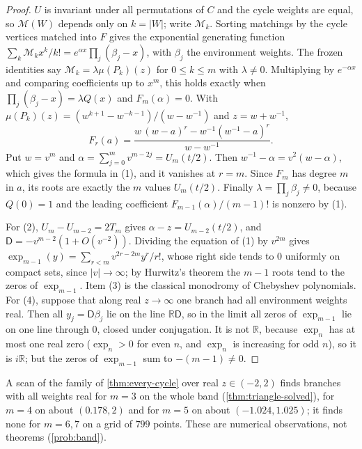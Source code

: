\documentclass[final]{siamart0516}
\numberwithin{theorem}{section}
\numberwithin{equation}{section}
\theoremstyle{siamnonum}
\renewenvironment{remark*}{\remarkstar}{\endremarkstar}
\theoremstyle{plain}
\newcommand{\RR}{\mathbb{R}}
\newcommand{\Mpot}{\mathcal{M}}           %
\begin{document}
\begin{proof}
$U$ is invariant under all permutations of $C$ and the cycle weights are equal, so $\Mpot(W)$ depends only on $k=|W|$; write $\Mpot_k$. Sorting matchings by the cycle vertices matched into $F$ gives the exponential generating function $\sum_k\Mpot_kx^{k}/k!=e^{\alpha x}\prod_j(\beta_j-x)$, with $\beta_j$ the environment weights. The frozen identities say $\Mpot_k=\lambda\mu(P_k)(z)$ for $0\le k\le m$ with $\lambda\neq0$. Multiplying by $e^{-\alpha x}$ and comparing coefficients up to $x^m$, this holds exactly when $\prod_j(\beta_j-x)=\lambda Q(x)$ and $F_m(\alpha)=0$. With $\mu(P_k)(z)=(w^{k+1}-w^{-k-1})/(w-w^{-1})$ and $z=w+w^{-1}$,
\[
F_r(a)=\frac{w\,(w-a)^{r}-w^{-1}(w^{-1}-a)^{r}}{w-w^{-1}}.
\]
Put $w=v^{m}$ and $\alpha=\sum_{j=0}^{m}v^{m-2j}=U_m(t/2)$. Then $w^{-1}-\alpha=v^{2}(w-\alpha)$, which gives the formula in (1), and it vanishes at $r=m$. Since $F_m$ has degree $m$ in $a$, its roots are exactly the $m$ values $U_m(t/2)$. Finally $\lambda=\prod_j\beta_j\neq0$, because $Q(0)=1$ and the leading coefficient $F_{m-1}(\alpha)/(m-1)!$ is nonzero by (1).

For (2), $U_m-U_{m-2}=2T_m$ gives $\alpha-z=U_{m-2}(t/2)$, and $\mathsf D=-v^{m-2}(1+O(v^{-2}))$. Dividing the equation of (1) by $v^{2m}$ gives $\exp_{m-1}(y)=\sum_{r<m}v^{2r-2m}y^{r}/r!$, whose right side tends to $0$ uniformly on compact sets, since $|v|\to\infty$; by Hurwitz's theorem the $m-1$ roots tend to the zeros of $\exp_{m-1}$. Item (3) is the classical monodromy of Chebyshev polynomials. For (4), suppose that along real $z\to\infty$ one branch had all environment weights real. Then all $y_j=\mathsf D\beta_j$ lie on the line $\RR\mathsf D$, so in the limit all zeros of $\exp_{m-1}$ lie on one line through $0$, closed under conjugation. It is not $\RR$, because $\exp_n$ has at most one real zero ($\exp_n>0$ for even $n$, and $\exp_n$ is increasing for odd $n$), so it is $i\RR$; but the zeros of $\exp_{m-1}$ sum to $-(m-1)\neq0$.
\end{proof}

\begin{remark*}
A scan of the family of \cref{thm:every-cycle} over real $z\in(-2,2)$ finds branches with all weights real for $m=3$ on the whole band (\cref{thm:triangle-solved}), for $m=4$ on about $(0.178,2)$ and for $m=5$ on about $(-1.024,1.025)$; it finds none for $m=6,7$ on a grid of $799$ points. These are numerical observations, not theorems (\cref{prob:band}).
\end{remark*}
\end{document}
